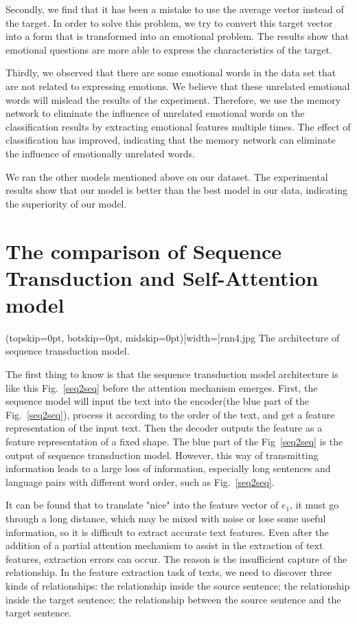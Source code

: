 \documentclass{ieeeaccess}
\begin{document}
Secondly, we find that it has been a mistake to use the average vector instead of the target. In order to solve this problem, we try to convert this target vector into a form that is transformed into an emotional problem. The results show that emotional questions are more able to express the characteristics of the target. 

Thirdly, we observed that there are some emotional words in the data set that are not related to expressing emotions. We believe that these unrelated emotional words will mislead the results of the experiment. Therefore, we use the memory network to eliminate the influence of unrelated emotional words on the classification results by extracting emotional features multiple times. The effect of classification has improved, indicating that the memory network can eliminate the influence of emotionally unrelated words. 

We ran the other models mentioned above on our dataset. The experimental results show that our model is better than the best model in our data, indicating the superiority of our model.

\section{The comparison of Sequence Transduction and Self-Attention model}

\Figure[htb!](topskip=0pt, botskip=0pt, midskip=0pt)[width=\textwidth]{rnn4.jpg}
{The architecture of sequence transduction model.\label{seq2seq}}

The first thing to know is that the sequence transduction model architecture is like this Fig.~\ref{seq2seq} before the attention mechanism emerges. First, the sequence model will input the text into the encoder(the blue part of the Fig.~\ref{seq2seq}), process it according to the order of the text, and get a feature representation of the input text. Then the decoder outputs the feature as a feature representation of a fixed shape. The blue part of the Fig~\ref{seq2seq} is the output of sequence transduction model. However, this way of transmitting information leads to a large loss of information, especially long sentences and language pairs with different word order, such as Fig.~\ref{seq2seq}.

It can be found that to translate "nice" into the feature vector of $e_1$, it must go through a long distance, which may be mixed with noise or lose some useful information, so it is difficult to extract accurate text features. Even after the addition of a partial attention mechanism to assist in the extraction of text features, extraction errors can occur. The reason is the insufficient capture of the relationship. In the feature extraction task of texts, we need to discover three kinds of relationships: the relationship inside the source sentence; the relationship inside the target sentence; the relationship between the source sentence and the target sentence.
\end{document}
